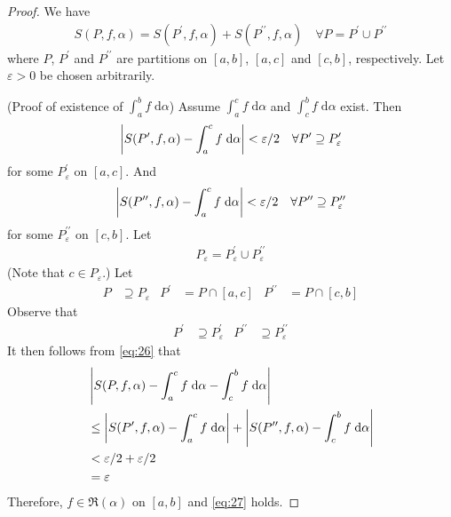 \documentclass[thmcnt=section, 12pt]{my-elegantbook}
\begin{document}
\begin{proof}
    We have 
    \begin{align}
        S(P,f,\alpha) = S(P^\prime, f, \alpha) + S(P^{\prime\prime}, f, \alpha)
        \quad
        \forall P = P^\prime \cup P^{\prime\prime}
        \label{eq:26}
    \end{align}
    where $P$, $P^\prime$ and $P^{\prime\prime}$ are partitions on $[a, b]$, $[a, c]$ and $[c, b]$, respectively. Let $\varepsilon > 0$ be chosen arbitrarily.

    \par (Proof of existence of $\int_a^b f \; \mathrm{d}\alpha$) Assume $\int_a^c f \; \mathrm{d}\alpha$ and $\int_c^b f \; \mathrm{d}\alpha$ exist. Then 
    \begin{align*}
        \left\lvert S(P^\prime, f, \alpha) - \int_a^c f \; \mathrm{d}\alpha \right\rvert < \varepsilon / 2
        \quad \forall P^\prime \supseteq P_\varepsilon^\prime
    \end{align*}
    for some $P_\varepsilon^\prime$ on $[a, c]$. And 
    \begin{align*}
        \left\lvert S(P^{\prime\prime}, f, \alpha) - \int_a^c f \; \mathrm{d}\alpha \right\rvert < \varepsilon / 2
        \quad \forall P^{\prime\prime} \supseteq P_\varepsilon^{\prime\prime}
    \end{align*}
    for some $P_\varepsilon^{\prime\prime}$ on $[c, b]$. Let
    \begin{align*}
        P_\varepsilon = P_\varepsilon^\prime \cup P_\varepsilon^{\prime\prime}
    \end{align*}
    (Note that $c \in P_\varepsilon$.) Let
    \begin{align*}
        P &\supseteq P_\varepsilon &
        P^\prime &= P \cap [a, c] &
        P^{\prime\prime} &= P \cap [c, b]
    \end{align*}
    Observe that
    \begin{align*}
        P^\prime &\supseteq P_\varepsilon^\prime & 
        P^{\prime\prime} &\supseteq P_\varepsilon^{\prime\prime}
    \end{align*}
    It then follows from \eqref{eq:26} that
    \begin{align*}
        &\left\lvert 
            S(P, f, \alpha)
            - \int_a^c f \; \mathrm{d}\alpha
            - \int_c^b f \; \mathrm{d}\alpha 
         \right\rvert \\ 
        &\leq \left\lvert 
            S(P^\prime, f, \alpha)
            - \int_a^c f \; \mathrm{d}\alpha
         \right\rvert + \left\lvert 
            S(P^{\prime\prime}, f, \alpha)
            - \int_c^b f \; \mathrm{d}\alpha
         \right\rvert \\ 
        &< \varepsilon / 2 + \varepsilon / 2 \\ 
        &= \varepsilon
    \end{align*} 
    Therefore, $f \in \mathfrak{R}(\alpha)$ on $[a, b]$ and \eqref{eq:27} holds.


\end{proof}
\end{document}
